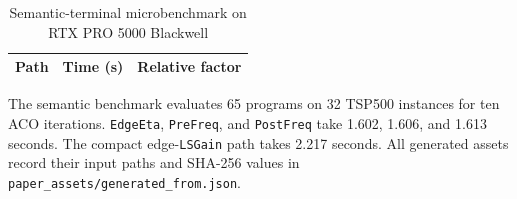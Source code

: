 \documentclass[letterpaper,journal]{IEEEtran}
\begin{document}
\begin{table}[h]
\caption{Semantic-terminal microbenchmark on RTX PRO 5000 Blackwell}
\label{tab:appendix-semantic}
\centering
\footnotesize
\begin{tabular}{lrr}
\toprule
Path & Time (s) & Relative factor\\
\midrule
%
\end{tabular}
\end{table}

The semantic benchmark evaluates 65 programs on 32 TSP500 instances for ten
ACO iterations.
\texttt{EdgeEta}, \texttt{PreFreq}, and \texttt{PostFreq} take 1.602,
1.606, and 1.613 seconds.
The compact edge-\texttt{LSGain} path takes 2.217 seconds.
All generated assets record their input paths and SHA-256 values in
\texttt{paper\_assets/generated\_from.json}.



\end{document}

